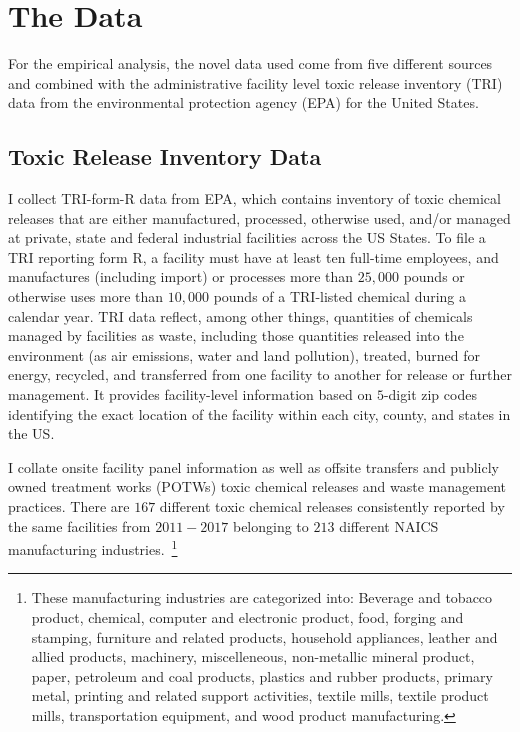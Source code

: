 \documentclass[12pt, english]{article}
\begin{document}
    \section{The Data}\label{sec:data}
    For the empirical analysis, the novel data used come from five different sources and combined with the administrative facility level toxic release inventory (TRI) data from the environmental protection agency (EPA) for the United States.

    \subsection{Toxic Release Inventory Data}\label{subsec:toxic-release-inventory-data}
    I collect TRI-form-R data from EPA, which contains inventory of toxic chemical releases that are either manufactured, processed, otherwise used, and/or managed at private, state and federal industrial facilities across the US States. To file a TRI reporting form R, a facility must have at least ten full-time employees, and manufactures (including import) or processes more than $25,000$ pounds or otherwise uses more than $10,000$ pounds of a TRI-listed chemical during a calendar year. TRI data reflect, among other things, quantities of chemicals managed by facilities as waste, including those quantities released into the environment (as air emissions, water and land pollution), treated, burned for energy, recycled, and transferred from one facility to another for release or further management. It provides facility-level information based on $5$-digit zip codes identifying the exact location of the facility within each city, county, and states in the US.

    I collate onsite facility panel information as well as offsite transfers and publicly owned treatment works (POTWs) toxic chemical releases and waste management practices. There are $167$ different toxic chemical releases consistently reported by the same facilities from $2011-2017$ belonging to $213$ different NAICS manufacturing industries.~\footnote{\tiny These manufacturing industries are categorized into: Beverage and tobacco product, chemical, computer and electronic product, food, forging and stamping, furniture and related products, household appliances, leather and allied products, machinery, miscelleneous, non-metallic mineral product, paper, petroleum and coal products, plastics and rubber products, primary metal, printing and related support activities, textile mills, textile product mills, transportation equipment, and wood product manufacturing.}
\end{document}
